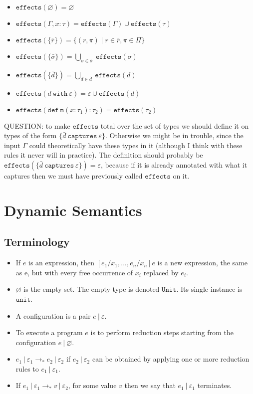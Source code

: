 \documentclass{llncs}
\newcommand{\keywadj}[1]{\mathtt{#1}}
\newcommand{\keyw}[1]{\keywadj{#1}~}
\begin{document}
\begin{itemize}
	\item $\keywadj{effects}(\varnothing) = \varnothing$
	\item $\keywadj{effects}(\Gamma, x : \tau) = \keywadj{effects}(\Gamma) \cup \keywadj{effects}(\tau)$
	\item $\keywadj{effects}(\{\bar r\}) = \{ (r, \pi) \mid r \in \bar r, \pi \in \Pi \}$
	\item $\keywadj{effects}(\{\bar \sigma\}) = \bigcup_{\sigma \in \bar \sigma}~\keywadj{effects}(\sigma)$
	\item $\keywadj{effects}(\{\bar d\}) = \bigcup_{d \in \bar d}~\keywadj{effects}(d)$
	\item $\keywadj{effects}(d~\keyw{with} \varepsilon) = \varepsilon \cup \keywadj{effects}(d)$
	\item $\keywadj{effects}(\keywadj{def~m}(x : \tau_1) : \tau_2) = \keywadj{effects}(\tau_2)$
\end{itemize}

\noindent
QUESTION: to make $\keywadj{effects}$ total over the set of types we should define it on types of the form $\{ \bar d~\keyw{captures} \varepsilon\}$. Otherwise we might be in trouble, since the input $\Gamma$ could theoretically have these types in it (although I think with these rules it never will in practice). The definition should probably be $\keywadj{effects}(\{ \bar d~\keyw{captures} \varepsilon\}) = \varepsilon$, because if it is already annotated with what it captures then we must have previously called $\keywadj{effects}$ on it.

\newpage


\section{Dynamic Semantics}

\subsection{Terminology}

\begin{itemize}
	\item If $e$ is an expression, then $[e_1/x_1, ..., e_n/x_n]e$ is a new expression, the same as e, but with every free occurrence of $x_i$ replaced by $e_i$.
	\item $\varnothing$ is the empty set. The empty type is denoted $\keywadj{Unit}$. Its single instance is $\keywadj{unit}$.
	\item A configuration is a pair $e~|~\varepsilon$.
	\item To execute a program $e$ is to perform reduction steps starting from the configuration $e~|~\varnothing$.
	\item $e_1~|~\varepsilon_1 \longrightarrow_* e_2~|~\varepsilon_2$ if $e_2~|~\varepsilon_2$ can be obtained by applying one or more reduction rules to $e_1~|~\varepsilon_1$.
	\item If $e_1~|~\varepsilon_1 \longrightarrow_* v~|~\varepsilon_2$, for some value $v$ then we say that $e_1~|~\varepsilon_1$ terminates.
\end{itemize}
\end{document}
